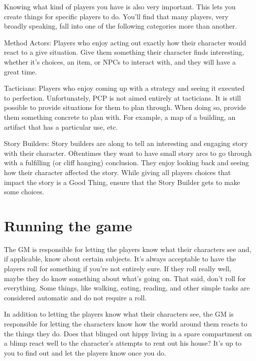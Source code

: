 \begin{flushleft}
Knowing what kind of players you have is also very important. This lets you
create things for specific players to do. You'll find that many players, very
broadly speaking, fall into one of the following categories more than another.

Method Actors: Players who enjoy acting out exactly how their character would
react to a give situation. Give them something their character finds
interesting, whether it's choices, an item, or NPCs to interact with, and they
will have a great time.

Tacticians: Players who enjoy coming up with a strategy and seeing it executed
to perfection. Unfortunately, PCP is not aimed entirely at tacticians. It is
still possible to provide situations for them to plan through. When doing so,
provide them something concrete to plan with. For example, a map of a building,
an artifact that has a particular use, etc.

Story Builders: Story builders are along to tell an interesting and engaging
story with their character. Oftentimes they want to have small story arcs to
go through with a fulfilling (or cliff hanging) conclusion. They enjoy looking
back and seeing how their character affected the story. While giving all players
choices that impact the story is a Good Thing, ensure that the Story Builder
gets to make some choices.

\section*{Running the game}

The GM is responsible for letting the players know what their characters see
and, if applicable, know about certain subjects. It's always acceptable to
have the players roll for something if you're not entirely sure. If they roll
really well, maybe they do know something about what's going on. That said,
don't roll for everything. Some things, like walking, eating, reading, and
other simple tasks are considered automatic and do not require a roll.

In addition to letting the players know what their characters see, the GM is
responsible for letting the characters know how the world around them reacts
to the things they do. Does that blinged out hippy living in a spare
compartment on a blimp react well to the character's attempts to rent out his
house? It's up to you to find out and let the players know once you do.


\end{flushleft}
